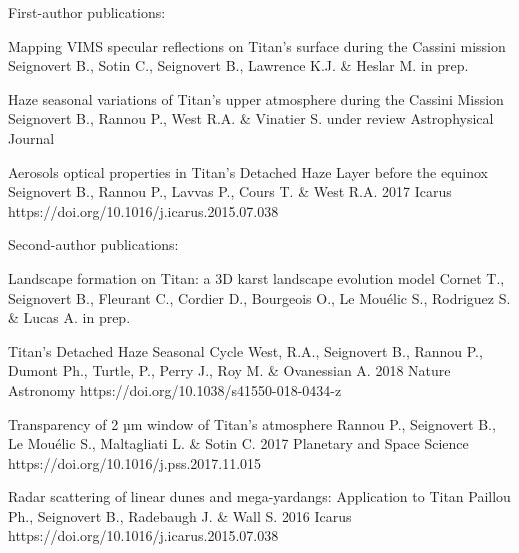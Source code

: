 
\begin{cvpublications}{First-author publications:}

	{Mapping VIMS specular reflections on Titan's surface during the Cassini mission}
	{Seignovert B., Sotin C., Seignovert B., Lawrence K.J. \& Heslar M.}
	{in prep.}
    {}
    {}

	{Haze seasonal variations of Titan's upper atmosphere during the Cassini Mission}
	{Seignovert B., Rannou P., West R.A. \& Vinatier S.}
	{under review}
    {Astrophysical Journal}
    {}

	{Aerosols optical properties in Titan's Detached Haze Layer before the equinox}
	{Seignovert B., Rannou P., Lavvas P., Cours T. \& West R.A.}
	{2017}
	{Icarus}
	{https://doi.org/10.1016/j.icarus.2015.07.038}

\end{cvpublications}

\begin{cvpublications}{Second-author publications:}

	{Landscape formation on Titan: a 3D karst landscape evolution model}
	{Cornet T., Seignovert B., Fleurant C., Cordier D., Bourgeois O., Le Mouélic S., Rodriguez S. \& Lucas A.}
	{in prep.}
    {}
    {}

	{Titan's Detached Haze Seasonal Cycle}
	{West, R.A., Seignovert B., Rannou P., Dumont Ph., Turtle,  P., Perry J., Roy M. \& Ovanessian A.}
	{2018}
    {Nature Astronomy}
    {https://doi.org/10.1038/s41550-018-0434-z}

	{Transparency of 2 µm window of Titan’s atmosphere}
	{Rannou P., Seignovert B., Le Mouélic S., Maltagliati L. \& Sotin C.}
	{2017}
	{Planetary and Space Science}
	{https://doi.org/10.1016/j.pss.2017.11.015}

	{Radar scattering of linear dunes and mega-yardangs: Application to Titan}
	{Paillou Ph., Seignovert B., Radebaugh J. \& Wall S.}
	{2016}
	{Icarus}
	{https://doi.org/10.1016/j.icarus.2015.07.038}

\end{cvpublications}

